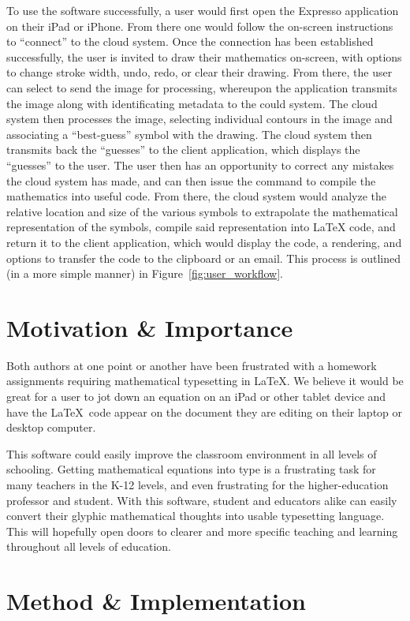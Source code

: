 \documentclass{acm_proc_article-sp}
\begin{document}
To use the software successfully, a user would first open the Expresso application on their iPad or iPhone. From there one would follow the on-screen instructions to ``connect'' to the cloud system. Once the connection has been established successfully, the user is invited to draw their mathematics on-screen, with options to change stroke width, undo, redo, or clear their drawing. From there, the user can select to send the image for processing, whereupon the application transmits the image along with identificating metadata to the could system. The cloud system then processes the image, selecting individual contours in the image and associating a ``best-guess'' symbol with the drawing. The cloud system then transmits back the ``guesses'' to the client application, which displays the ``guesses'' to the user. The user then has an opportunity to correct any mistakes the cloud system has made, and can then issue the command to compile the mathematics into useful code. From there, the cloud system would analyze the relative location and size of the various symbols to extrapolate the mathematical representation of the symbols, compile said representation into \LaTeX{} code, and return it to the client application, which would display the code, a rendering, and options to transfer the code to the clipboard or an email. This process is outlined (in a more simple manner) in Figure~\ref{fig:user_workflow}.

\section{Motivation \& Importance}
Both authors at one point or another have been frustrated with a homework assignments requiring mathematical typesetting in \LaTeX{}.  We believe it would be great for a user to jot down an equation on an iPad or other tablet device and have the \LaTeX{}\ code appear on the document they are editing on their laptop or desktop computer.

This software could easily improve the classroom environment in all levels of schooling. Getting mathematical equations into type is a frustrating task for many teachers in the K-12 levels, and even frustrating for the higher-education professor and student. With this software, student and educators alike can easily convert their glyphic mathematical thoughts into usable typesetting language. This will hopefully open doors to clearer and more specific teaching and learning throughout all levels of education.

\section{Method \& Implementation}
\end{document}

